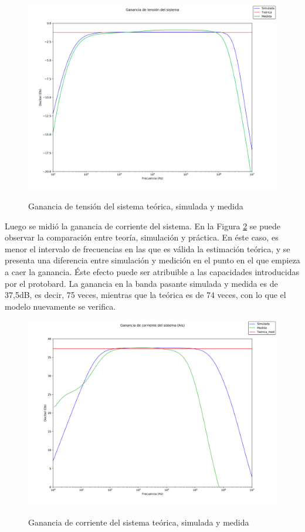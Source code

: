 		\begin{figure}[H]
			\centering
			\includegraphics[scale=0.4]{./Imagenes/bode_Avs.png} \\
			\caption{Ganancia de tensión del sistema teórica, simulada y medida}
			\label{fig_bode_avs}
		\end{figure}

Luego se midió la ganancia de corriente del sistema. En la Figura \ref{fig_bode_ais} se puede observar la comparación entre teoría, simulación y práctica. En éste caso, es menor el intervalo de frecuencias en las que es válida la estimación teórica, y se presenta una diferencia entre simulación y medición en el punto en el que empieza a caer la ganancia. Éste efecto puede ser atribuible a las capacidades introducidas por el protobard. La ganancia en la banda pasante simulada y medida es de 37,5dB, es decir, 75 veces, mientras que la teórica es de 74 veces, con lo que el modelo nuevamente se verifica. 


		\begin{figure}[H]
			\centering
			\includegraphics[scale=0.3]{./Imagenes/bode_Ais.png} \\
			\caption{Ganancia de corriente del sistema teórica, simulada y medida}
			\label{fig_bode_ais}
		\end{figure}

